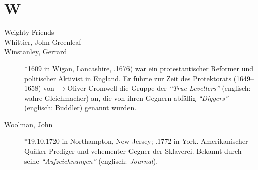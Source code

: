 \section*{W}

\articlesize

\begin{description}
 \item[Weighty Friends]

 \item[Whittier, John Greenleaf]

 \item[Winstanley, Gerrard] $\ast$1609 in Wigan, Lancashire, .1676) war ein protestantischer Reformer und politischer Aktivist in England. Er führte zur Zeit des Protektorats (1649–1658) von $\to$Oliver Cromwell die Gruppe der \textit{"`True Levellers"'} (englisch: wahre Gleichmacher) an, die von ihren Gegnern abfällig \textit{"`Diggers"'} (englisch: Buddler) genannt wurden.

\item[Woolman, John] $\ast$19.10.1720 in Northampton, New Jersey; .1772 in York. Amerikanischer Quäker-Prediger und vehementer Gegner der Sklaverei. Bekannt durch seine \textit{"`Aufzeichnungen"'} (englisch: \textit{Journal}).

 \end{description}


\normalsize